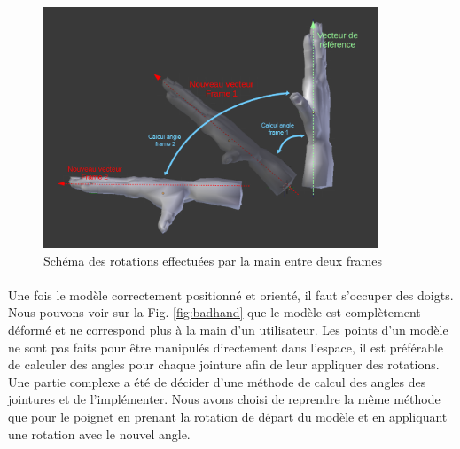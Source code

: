 \begin{figure}
 \centering
 \includegraphics[width=10cm]{images/schema_vecteur.png}
 \caption{Schéma des rotations effectuées par la main entre deux frames}
 \label{fig:schemaAngle}
\end{figure}


%
\paragraph{} 
Une fois le modèle correctement positionné et orienté, il faut s'occuper des doigts.
Nous pouvons voir sur la Fig. \ref{fig:badhand} que le modèle est complètement déformé et ne correspond plus à la main d'un utilisateur. Les points d'un modèle ne sont pas faits pour être manipulés directement dans l'espace, il est préférable de calculer des angles pour chaque jointure afin de leur appliquer 
des rotations. Une partie complexe a été de décider d'une méthode de calcul des angles des jointures et de l'implémenter.
Nous avons choisi de reprendre la même méthode que pour le poignet en prenant la rotation de départ du modèle et en appliquant une rotation avec le nouvel angle.



